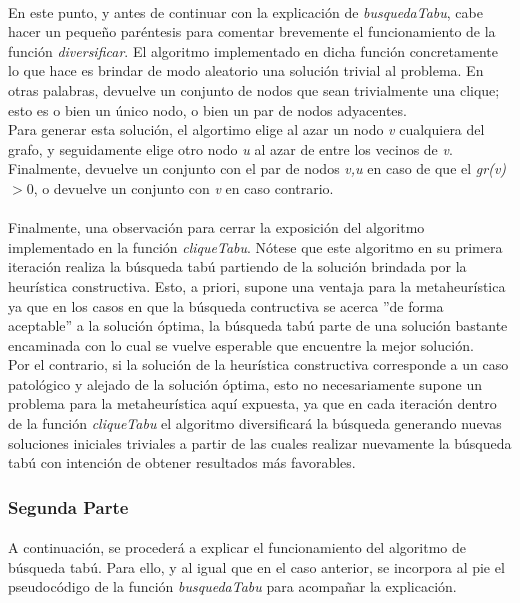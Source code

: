 \paragraph{}
En este punto, y antes de continuar con la explicación de \textit{busquedaTabu}, cabe hacer un pequeño paréntesis para comentar brevemente el funcionamiento de la función \textit{diversificar}. El algoritmo implementado en dicha función concretamente lo que hace es brindar de modo aleatorio una solución trivial al problema. En otras palabras, devuelve un conjunto de nodos que sean trivialmente una clique; esto es o bien un único nodo, o bien un par de nodos adyacentes. \\
Para generar esta solución, el algortimo elige al azar un nodo \textit{v} cualquiera del grafo, y seguidamente elige otro nodo \textit{u} al azar de entre los vecinos de \textit{v}. Finalmente, devuelve un conjunto con el par de nodos \textit{v,u} en caso de que el \textit{gr(v)} $ > 0$, o devuelve un conjunto con \textit{v} en caso contrario.

\paragraph{}
Finalmente, una observación para cerrar la exposición del algoritmo implementado en la función \textit{cliqueTabu}. Nótese que este algoritmo en su primera iteración realiza la búsqueda tabú partiendo de la solución brindada por la heurística constructiva. Esto, a priori, supone una ventaja para la metaheurística ya que en los casos en que la búsqueda contructiva se acerca ''de forma aceptable'' a la solución óptima, la búsqueda tabú parte de una solución bastante encaminada con lo cual se vuelve esperable que encuentre la mejor solución. \\
Por el contrario, si la solución de la heurística constructiva corresponde a un caso patológico y alejado de la solución óptima, esto no necesariamente supone un problema para la metaheurística aquí expuesta, ya que en cada iteración dentro de la función \textit{cliqueTabu} el algoritmo diversificará la búsqueda generando nuevas soluciones iniciales triviales a partir de las cuales realizar nuevamente la búsqueda tabú con intención de obtener resultados más favorables.


\subsubsection{Segunda Parte}
\paragraph{}
A continuación, se procederá a explicar el funcionamiento del algoritmo de búsqueda tabú. Para ello, y al igual que en el caso anterior, se incorpora al pie el pseudocódigo de la función \textit{busquedaTabu} para acompañar la explicación. \\


